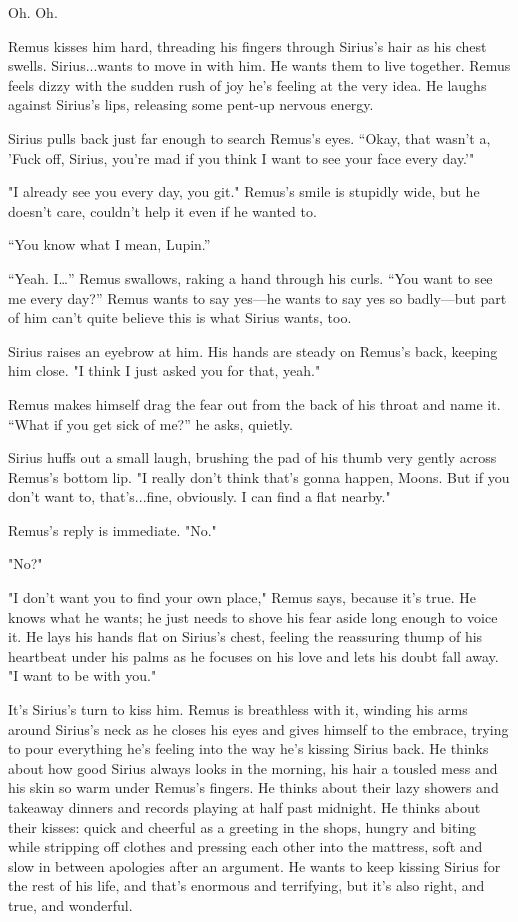 Oh. Oh.

Remus kisses him hard, threading his fingers through Sirius's hair as his chest swells. Sirius...wants to move in with him. He wants them to live together. Remus feels dizzy with the sudden rush of joy he's feeling at the very idea. He laughs against Sirius’s lips, releasing some pent-up nervous energy.

Sirius pulls back just far enough to search Remus's eyes. “Okay, that wasn’t a, 'Fuck off, Sirius, you’re mad if you think I want to see your face every day.'"

"I already see you every day, you git." Remus's smile is stupidly wide, but he doesn't care, couldn't help it even if he wanted to.

“You know what I mean, Lupin.”

“Yeah. I…” Remus swallows, raking a hand through his curls. “You want to see me every day?” Remus wants to say yes—he wants to say yes so badly—but part of him can’t quite believe this is what Sirius wants, too.

Sirius raises an eyebrow at him. His hands are steady on Remus's back, keeping him close. "I think I just asked you for that, yeah."

Remus makes himself drag the fear out from the back of his throat and name it. “What if you get sick of me?” he asks, quietly.

Sirius huffs out a small laugh, brushing the pad of his thumb very gently across Remus's bottom lip. "I really don't think that's gonna happen, Moons. But if you don't want to, that's...fine, obviously. I can find a flat nearby."

Remus's reply is immediate. "No."

"No?"

"I don't want you to find your own place," Remus says, because it's true. He knows what he wants; he just needs to shove his fear aside long enough to voice it. He lays his hands flat on Sirius's chest, feeling the reassuring thump of his heartbeat under his palms as he focuses on his love and lets his doubt fall away. "I want to be with you."

It's Sirius's turn to kiss him. Remus is breathless with it, winding his arms around Sirius's neck as he closes his eyes and gives himself to the embrace, trying to pour everything he's feeling into the way he's kissing Sirius back. He thinks about how good Sirius always looks in the morning, his hair a tousled mess and his skin so warm under Remus's fingers. He thinks about their lazy showers and takeaway dinners and records playing at half past midnight. He thinks about their kisses: quick and cheerful as a greeting in the shops, hungry and biting while stripping off clothes and pressing each other into the mattress, soft and slow in between apologies after an argument. He wants to keep kissing Sirius for the rest of his life, and that's enormous and terrifying, but it's also right, and true, and wonderful.


